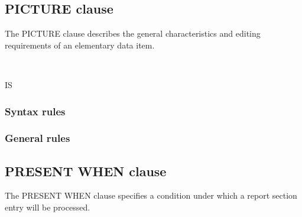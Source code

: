 \subsection{PICTURE clause}

The PICTURE clause describes the general characteristics and editing requirements of an elementary data item.

\begin{syntax}
  \begin{1=}
     \\
  \end{1=}
  IS 
\end{syntax}

\subsubsection{Syntax rules}

\subsubsection{General rules}

\subsection{PRESENT WHEN clause}

The PRESENT WHEN clause specifies a condition under which a report section entry will be processed.

\begin{syntax}
  \begin{1=}
     \\
  \end{1=}
  \begin{1=}
     \condition \\

     \\

  \end{1=}
\end{syntax}

